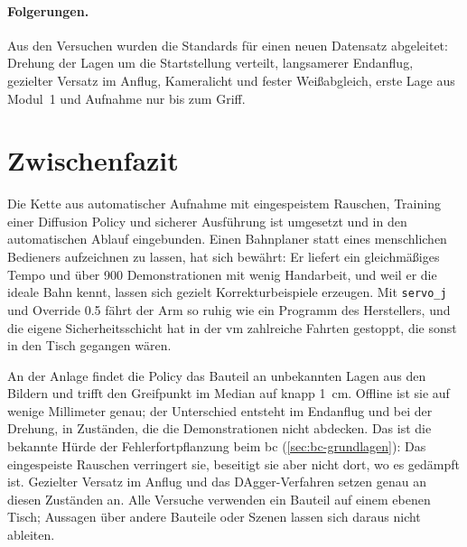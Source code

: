 \paragraph{Folgerungen.} Aus den Versuchen wurden die Standards für einen neuen Datensatz
abgeleitet: Drehung der Lagen um die Startstellung verteilt, langsamerer Endanflug, gezielter
Versatz im Anflug, Kameralicht und fester Weißabgleich, erste Lage aus Modul~1 und Aufnahme nur bis
zum Griff.


\section{Zwischenfazit}
\label{sec:m4-fazit}

Die Kette aus automatischer Aufnahme mit eingespeistem Rauschen, Training einer Diffusion
Policy und sicherer Ausführung ist umgesetzt und in den automatischen Ablauf eingebunden. Einen
Bahnplaner statt eines menschlichen Bedieners aufzeichnen zu lassen, hat sich bewährt: Er liefert
ein gleichmäßiges Tempo und über 900 Demonstrationen mit wenig Handarbeit, und weil er die ideale
Bahn kennt, lassen sich gezielt Korrekturbeispiele erzeugen. Mit \texttt{servo\_j} und Override
\num{0.5} fährt der Arm so ruhig wie ein Programm des Herstellers, und die eigene
Sicherheitsschicht hat in der \ac{vm} zahlreiche Fahrten gestoppt, die sonst in den Tisch gegangen
wären.

An der Anlage findet die Policy das Bauteil an unbekannten Lagen aus den Bildern und trifft den
Greifpunkt im Median auf knapp \SI{1}{\centi\metre}. Offline ist sie auf wenige Millimeter genau;
der Unterschied entsteht im Endanflug und bei der Drehung, in Zuständen, die die Demonstrationen
nicht abdecken. Das ist die bekannte Hürde der Fehlerfortpflanzung beim \ac{bc}
(\cref{sec:bc-grundlagen}): Das eingespeiste Rauschen verringert sie, beseitigt sie aber nicht dort,
wo es gedämpft ist. Gezielter Versatz im Anflug und das DAgger-Verfahren setzen genau an diesen
Zuständen an. Alle Versuche verwenden ein Bauteil auf einem ebenen Tisch; Aussagen über andere
Bauteile oder Szenen lassen sich daraus nicht ableiten.
